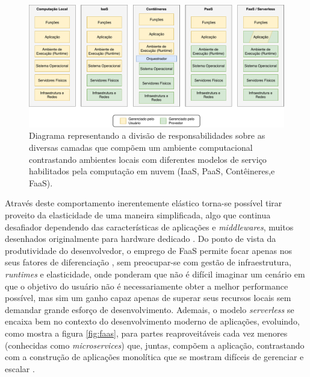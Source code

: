 \documentclass[english,brazilian]{UNISINOSmonografia} %
\newcommand\defaultFigureWidth{0.9}
\begin{document}
\begin{figure}[tb]
	\centering%
	\begin{minipage}{\defaultFigureWidth\textwidth}
		\caption{Diagrama representando a divisão de responsabilidades sobre as diversas camadas que compõem um ambiente computacional contrastando ambientes locais com diferentes modelos de serviço habilitados pela computação em nuvem (IaaS, PaaS, Contêineres,e FaaS).}
		\label{fig:faas}
		\vspace{1ex}
		\includegraphics[clip,width=\textwidth]{mestrado-faas}
	\end{minipage}
\end{figure}



Através deste comportamento inerentemente elástico torna-se possível tirar proveito da elasticidade de uma maneira simplificada, algo que continua desafiador dependendo das características de aplicações e \textit{middlewares}, muitos desenhados originalmente para hardware dedicado \cite{Jonas2017}.
Do ponto de vista da produtividade do desenvolvedor, o emprego de FaaS permite focar apenas nos seus fatores de diferenciação \cite{BoweiHan}, sem preocupar-se com gestão de infraestrutura, \textit{runtimes} e elasticidade, onde  ponderam que não é difícil imaginar um cenário em que o objetivo do usuário não é necessariamente obter a melhor performance possível, mas sim um ganho capaz apenas de superar seus recursos locais sem demandar grande esforço de desenvolvimento.
Ademais, o modelo \textit{serverless} se encaixa bem no contexto do desenvolvimento moderno de aplicações, evoluindo, como mostra a figura \autoref{fig:faas}, para partes reaproveitáveis cada vez menores (conhecidas como \textit{microservices}) que, juntas, compõem a aplicação, contrastando com a construção de aplicações monolítica que se mostram difíceis de gerenciar e escalar \cite{Eivy2017}.
\end{document}

